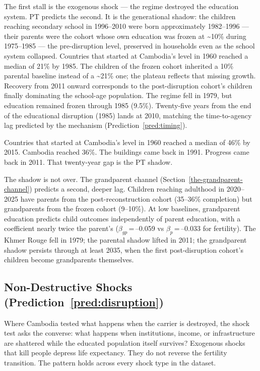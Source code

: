 \documentclass[12pt,letterpaper]{article}
\begin{document}
The first stall is the exogenous shock --- the regime destroyed the
education system. PT predicts the second. It is the generational shadow:
the children reaching secondary school in 1996--2010 were born
approximately 1982--1996 --- their parents were the cohort whose own
education was frozen at \textasciitilde10\% during 1975--1985 --- the
pre-disruption level, preserved in households even as the school system
collapsed. Countries that started at Cambodia's level in 1960 reached a
median of 21\% by 1985. The children of the frozen cohort inherited a
10\% parental baseline instead of a \textasciitilde21\% one; the plateau
reflects that missing growth. Recovery
from 2011 onward corresponds to the post-disruption cohort's children
finally dominating the school-age population. The regime fell in 1979,
but education remained frozen through 1985 (9.5\%). Twenty-five years
from the end of the educational disruption (1985) lands at 2010, matching the time-to-agency lag predicted by the mechanism (Prediction~\ref{pred:timing}).

Countries that started at Cambodia's level in 1960 reached a median of
46\% by 2015. Cambodia reached 36\%. The buildings came back in 1991.
Progress came back in 2011. That twenty-year gap is the PT shadow.

The shadow is not over. The grandparent channel
(Section~\ref{the-grandparent-channel}) predicts a second, deeper lag.
Children reaching adulthood in 2020--2025 have parents from the
post-reconstruction cohort (35--36\% completion) but grandparents from
the frozen cohort (9--10\%). At low baselines, grandparent education
predicts child outcomes independently of parent education, with a
coefficient nearly twice the parent's
($\beta_{gp}$\,=\,--0.059 vs $\beta_p$\,=\,--0.033 for fertility).
The Khmer Rouge fell in 1979; the parental shadow lifted in 2011;
the grandparent shadow persists through at least 2035, when the first
post-disruption cohort's children become grandparents themselves.


\subsection{Non-Destructive Shocks (Prediction~\ref{pred:disruption})}\label{the-shock-test}

Where Cambodia tested what happens when the carrier is destroyed,
the shock test asks the converse: what happens when institutions,
income, or infrastructure are shattered while the educated population
itself survives? Exogenous shocks that kill people depress life
expectancy. They do not reverse the fertility transition. The pattern holds across every shock type in the dataset.
\end{document}
